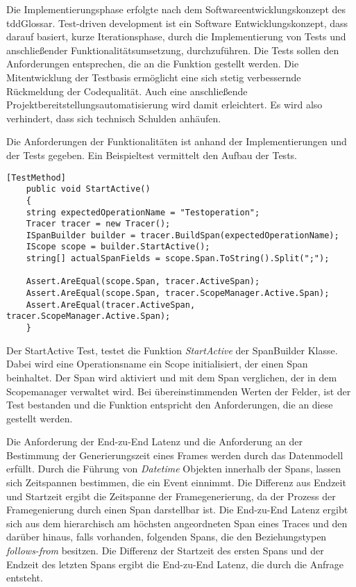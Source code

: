 Die Implementierungsphase erfolgte nach dem Softwareentwicklungskonzept des \gls{tddGlossar}. Test-driven development ist ein Software Entwicklungskonzept, dass darauf basiert, kurze Iterationsphase, durch die Implementierung von Tests und anschließender Funktionalitätsumsetzung, durchzuführen. Die Tests sollen den Anforderungen entsprechen, die an die Funktion gestellt werden. Die Mitentwicklung der Testbasis ermöglicht eine sich stetig verbessernde Rückmeldung der Codequalität. Auch eine anschließende Projektbereitstellungsautomatisierung wird damit erleichtert. Es wird also verhindert, dass sich technisch Schulden anhäufen.

Die Anforderungen der Funktionalitäten ist anhand der Implementierungen und der Tests gegeben. Ein Beispieltest vermittelt den Aufbau der Tests.

\begin{minipage}[]{\textwidth}
	\begin{lstlisting}[frame=trBL]
	[TestMethod]
	public void StartActive()
	{
	string expectedOperationName = "Testoperation";
	Tracer tracer = new Tracer();
	ISpanBuilder builder = tracer.BuildSpan(expectedOperationName);
	IScope scope = builder.StartActive();
	string[] actualSpanFields = scope.Span.ToString().Split(";");
	
	Assert.AreEqual(scope.Span, tracer.ActiveSpan);
	Assert.AreEqual(scope.Span, tracer.ScopeManager.Active.Span);
	Assert.AreEqual(tracer.ActiveSpan, tracer.ScopeManager.Active.Span);
	}
	\end{lstlisting}
	\label{listing:Unit-Test der Spanbuilder Klasse}
\end{minipage}

Der StartActive Test, testet die Funktion \emph{StartActive} der SpanBuilder Klasse. Dabei wird eine Operationsname ein Scope initialisiert, der einen Span beinhaltet. Der Span wird aktiviert und mit dem Span verglichen, der in dem Scopemanager verwaltet wird. Bei übereinstimmenden Werten der Felder, ist der Test bestanden und die Funktion entspricht den Anforderungen, die an diese gestellt werden.

Die Anforderung der End-zu-End Latenz und die Anforderung an der Bestimmung der Generierungszeit eines Frames werden durch das Datenmodell erfüllt. Durch die Führung von \emph{Datetime} Objekten innerhalb der Spans, lassen sich Zeitspannen bestimmen, die ein Event einnimmt. Die Differenz aus Endzeit und Startzeit ergibt die Zeitspanne der Framegenerierung, da der Prozess der Framegenierung durch einen Span darstellbar ist. Die End-zu-End Latenz ergibt sich aus dem hierarchisch am höchsten angeordneten Span eines Traces und den darüber hinaus, falls vorhanden, folgenden Spans, die den Beziehungstypen \emph{follows-from} besitzen. Die Differenz der Startzeit des ersten Spans und der Endzeit des letzten Spans ergibt die End-zu-End Latenz, die durch die Anfrage entsteht.

